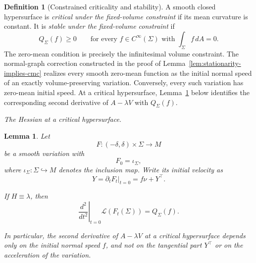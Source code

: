 \documentclass[11pt,reqno]{amsart}
\numberwithin{equation}{section}
\newtheorem{lemma}[theorem]{Lemma}
\theoremstyle{definition}
\newtheorem{definition}[theorem]{Definition}
\theoremstyle{remark}
\newcommand{\ithead}[1]{%
  \par\medskip\noindent\textit{#1}\enspace
}
\begin{document}
\begin{definition}[Constrained criticality and stability]
\label{def:constrained-stability}
A smooth closed hypersurface is \emph{critical under the fixed-volume
constraint} if its mean curvature is constant. It is
\emph{stable under the fixed-volume constraint} if
\[
Q_\Sigma(f)\ge0
\qquad
\text{for every }f\in C^\infty(\Sigma)
\text{ with }\int_\Sigma f\,dA=0.
\]
The zero-mean condition is precisely the infinitesimal volume constraint.
The normal-graph correction constructed in the proof of
Lemma~\ref{lem:stationarity-implies-cmc} realizes every smooth zero-mean
function as the initial normal speed of an exactly volume-preserving
variation. Conversely, every such variation has zero-mean initial speed.
At a critical hypersurface, Lemma~\ref{lem:Hessian-property} below
identifies the corresponding second derivative of \(A-\lambda V\) with
\(Q_\Sigma(f)\).
\end{definition}

\ithead{The Hessian at a critical hypersurface.}

\begin{lemma}
\label{lem:Hessian-property}
Let
\[
F:(-\delta,\delta)\times\Sigma\longrightarrow M
\]
be a smooth variation with
\[
F_0=\iota_\Sigma,
\]
where \(\iota_\Sigma:\Sigma\hookrightarrow M\) denotes the inclusion map.
Write its initial velocity as
\[
Y
=
\left.\partial_tF_t\right|_{t=0}
=
f\nu+Y^\top.
\]

If \(H\equiv\lambda\), then
\[
\left.
\frac{d^2}{dt^2}
\right|_{t=0}
\mathcal L(F_t(\Sigma))
=
Q_\Sigma(f).
\]

In particular, the second derivative of \(A-\lambda V\) at a critical
hypersurface depends only on the initial normal speed \(f\), and not on
the tangential part \(Y^\top\) or on the acceleration of the variation.
\end{lemma}
\end{document}
